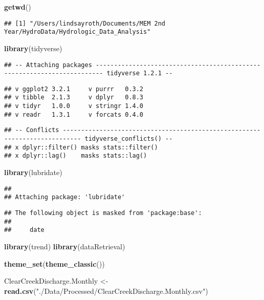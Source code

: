 \documentclass[]{article}
\newenvironment{Shaded}{\begin{snugshade}}{\end{snugshade}}
\newcommand{\KeywordTok}[1]{\textcolor[rgb]{0.13,0.29,0.53}{\textbf{#1}}}
\newcommand{\NormalTok}[1]{#1}
\newcommand{\StringTok}[1]{\textcolor[rgb]{0.31,0.60,0.02}{#1}}
\begin{document}
\begin{Shaded}
\begin{Highlighting}[]
\KeywordTok{getwd}\NormalTok{()}
\end{Highlighting}
\end{Shaded}

\begin{verbatim}
## [1] "/Users/lindsayroth/Documents/MEM 2nd Year/HydroData/Hydrologic_Data_Analysis"
\end{verbatim}

\begin{Shaded}
\begin{Highlighting}[]
\KeywordTok{library}\NormalTok{(tidyverse)}
\end{Highlighting}
\end{Shaded}

\begin{verbatim}
## -- Attaching packages ------------------------------------------------------------------------ tidyverse 1.2.1 --
\end{verbatim}

\begin{verbatim}
## v ggplot2 3.2.1     v purrr   0.3.2
## v tibble  2.1.3     v dplyr   0.8.3
## v tidyr   1.0.0     v stringr 1.4.0
## v readr   1.3.1     v forcats 0.4.0
\end{verbatim}

\begin{verbatim}
## -- Conflicts --------------------------------------------------------------------------- tidyverse_conflicts() --
## x dplyr::filter() masks stats::filter()
## x dplyr::lag()    masks stats::lag()
\end{verbatim}

\begin{Shaded}
\begin{Highlighting}[]
\KeywordTok{library}\NormalTok{(lubridate)}
\end{Highlighting}
\end{Shaded}

\begin{verbatim}
## 
## Attaching package: 'lubridate'
\end{verbatim}

\begin{verbatim}
## The following object is masked from 'package:base':
## 
##     date
\end{verbatim}

\begin{Shaded}
\begin{Highlighting}[]
\KeywordTok{library}\NormalTok{(trend)}
\KeywordTok{library}\NormalTok{(dataRetrieval)}

\KeywordTok{theme_set}\NormalTok{(}\KeywordTok{theme_classic}\NormalTok{())}

\NormalTok{ClearCreekDischarge.Monthly <-}\StringTok{ }\KeywordTok{read.csv}\NormalTok{(}\StringTok{"./Data/Processed/ClearCreekDischarge.Monthly.csv"}\NormalTok{)}
\end{Highlighting}
\end{Shaded}
\end{document}
